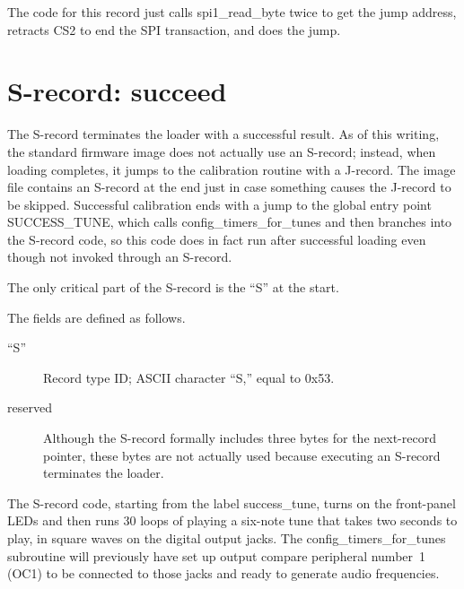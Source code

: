 The code for this record just calls spi1\_read\_byte twice to get the jump
address, retracts CS2 to end the SPI transaction, and does the jump.

\section{S-record: succeed}

The S-record terminates the loader with a successful result.  As of this
writing, the standard firmware image does not actually use an S-record;
instead, when loading completes, it jumps to the calibration routine with a
J-record.  The image file contains an S-record at the end just in case
something causes the J-record to be skipped.  Successful calibration ends
with a jump to the global entry point SUCCESS\_TUNE, which calls
config\_timers\_for\_tunes and then branches into the S-record code, so this
code does in fact run after successful loading even though not invoked
through an S-record.

The only critical part of the S-record is the ``S'' at the start.


The fields are defined as follows.

\begin{description}
  \item[``S''] Record type ID; ASCII character ``S,'' equal to 0x53.
  \item[reserved]  Although the S-record formally includes three bytes for
    the next-record pointer, these bytes are not actually used because
    executing an S-record terminates the loader.
\end{description}

The S-record code, starting from the label success\_tune, turns on the
front-panel LEDs and then runs 30 loops of playing a six-note tune that
takes two seconds to play, in square waves on the digital output jacks.  The
config\_timers\_for\_tunes subroutine will previously have set up output
compare peripheral number~1 (OC1) to be connected to those jacks and ready
to generate audio frequencies.

